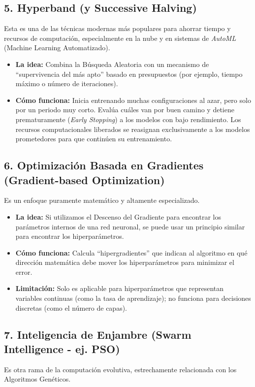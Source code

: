 \subsection{5. Hyperband (y Successive Halving)}
Esta es una de las técnicas modernas más populares para ahorrar tiempo y recursos de computación, especialmente en la nube y en sistemas de \textit{AutoML} (Machine Learning Automatizado).

\begin{itemize}
    \item \textbf{La idea:} Combina la Búsqueda Aleatoria con un mecanismo de ``supervivencia del más apto'' basado en presupuestos (por ejemplo, tiempo máximo o número de iteraciones).
    \item \textbf{Cómo funciona:} Inicia entrenando muchas configuraciones al azar, pero solo por un periodo muy corto. Evalúa cuáles van por buen camino y detiene prematuramente (\textit{Early Stopping}) a los modelos con bajo rendimiento. Los recursos computacionales liberados se reasignan exclusivamente a los modelos prometedores para que continúen su entrenamiento.
\end{itemize}

\subsection{6. Optimización Basada en Gradientes (Gradient-based Optimization)}
Es un enfoque puramente matemático y altamente especializado.

\begin{itemize}
    \item \textbf{La idea:} Si utilizamos el Descenso del Gradiente para encontrar los parámetros internos de una red neuronal, se puede usar un principio similar para encontrar los hiperparámetros.
    \item \textbf{Cómo funciona:} Calcula ``hipergradientes'' que indican al algoritmo en qué dirección matemática debe mover los hiperparámetros para minimizar el error.
    \item \textbf{Limitación:} Solo es aplicable para hiperparámetros que representan variables continuas (como la tasa de aprendizaje); no funciona para decisiones discretas (como el número de capas).
\end{itemize}

\subsection{7. Inteligencia de Enjambre (Swarm Intelligence - ej. PSO)}
Es otra rama de la computación evolutiva, estrechamente relacionada con los Algoritmos Genéticos.

